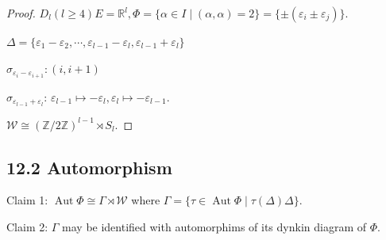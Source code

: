 \documentclass{article}
\theoremstyle{definition}
\begin{document}
\begin{proof}
    \(D_l (l \geq 4) E = \mathbb{R}^l, \Phi = \{ \alpha \in I \mid (\alpha , \alpha) = 2 \} = \{\pm (\varepsilon_i \pm \varepsilon_j)\}\).

    \(\Delta = \{ \varepsilon_1 - \varepsilon_2 , \cdots , \varepsilon_{l-1} - \varepsilon_l, \varepsilon_{l-1} + \varepsilon_l \} \)
    
    \(\sigma_{\varepsilon_{i} - \varepsilon_{i+1} }: (i, i+1)\)
    
    \(\sigma_{\varepsilon_{l-1} + \varepsilon_l} \): \(\varepsilon_{l-1} \mapsto - \varepsilon_l, \varepsilon_l \mapsto - \varepsilon_{l-1}\).

    \(\mathcal{W} \cong (\mathbb{Z} / 2\mathbb{Z})^{l-1} \rtimes S_l\).
    

\end{proof}

\subsection{12.2 Automorphism}

Claim 1: \(\operatorname{Aut} \Phi \cong \Gamma \rtimes \mathcal{W}\) where \(\Gamma = \{ \tau \in \operatorname{Aut} \Phi \mid \tau(\Delta)  \Delta \} \).

Claim 2: \(\Gamma\) may be identified with automorphims of its dynkin diagram of \(\Phi\).
\end{document}
